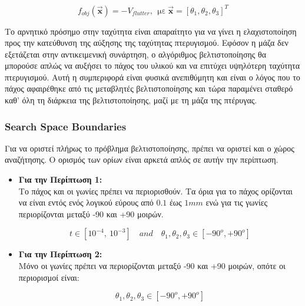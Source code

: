 \begin{equation}
f_{obj}\left( \vec{\mathbf{x}} \right) = - V_{flutter},\ \ \text{με}\ \vec{\mathbf{x}}\mathbf{=}\left\lbrack \theta_{1},\theta_{2},\theta_{3} \right\rbrack^{T}
\label{eq:objpowell2}
\end{equation}

Το αρνητικό πρόσημο στην ταχύτητα είναι απαραίτητο για να γίνει η ελαχιστοποίηση προς την κατεύθυνση της αύξησης της ταχύτητας πτερυγισμού. Εφόσον η μάζα δεν εξετάζεται στην αντικειμενική συνάρτηση, ο αλγόριθμος βελτιστοποίησης θα μπορούσε απλώς να αυξήσει το πάχος του υλικού και να επιτύχει υψηλότερη ταχύτητα πτερυγισμού. Αυτή η συμπεριφορά είναι φυσικά ανεπιθύμητη και είναι ο λόγος που το πάχος αφαιρέθηκε από τις μεταβλητές βελτιστοποίησης και τώρα παραμένει σταθερό καθ' όλη τη διάρκεια της βελτιστοποίησης, μαζί με τη μάζα της πτέρυγας.


\subsubsection{\textlatin{Search Space Boundaries}}

Για να οριστεί πλήρως το πρόβλημα βελτιστοποίησης, πρέπει να οριστεί και ο χώρος αναζήτησης. Ο ορισμός των ορίων είναι αρκετά απλός σε αυτήν την περίπτωση.

\begin{itemize}
\item
  \textbf{Για την Περίπτωση 1:} \\
  Το πάχος και οι γωνίες πρέπει να περιορισθούν. Τα όρια για το πάχος ορίζονται να είναι εντός ενός λογικού εύρους από $0.1$ έως $1 mm$ ενώ για τις γωνίες περιορίζονται μεταξύ -90 και +90 μοιρών.

  \begin{equation}
    t \in [ 10^{- 4},\ 10^{- 3} ]\quad and \quad \theta_{1},\theta_{2},\theta_{3} \in [ - 90^{o}, + 90^{o} ]
    \end{equation}


\item
  \textbf{Για την Περίπτωση 2:} \\
  Μόνο οι γωνίες πρέπει να περιορίζονται μεταξύ -90 και +90 μοιρών, οπότε οι περιορισμοί είναι:

  \begin{equation}
    \theta_{1},\theta_{2},\theta_{3} \in [ - 90^{o}, + 90^{o} ]
  \end{equation}



\end{itemize}



